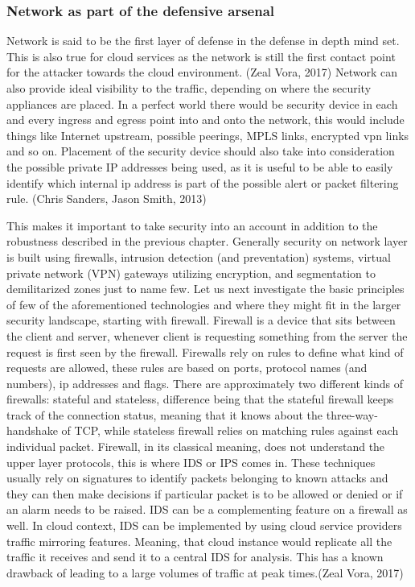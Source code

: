 \documentclass{article}
\begin{document}
\subsubsection{Network as part of the defensive arsenal}
Network is said to be the first layer of defense in the defense in depth mind set. This is also true for cloud services as the network is still the first contact point for the attacker towards the cloud environment. (Zeal Vora, 2017)
Network can also provide ideal visibility to the traffic, depending on where the security appliances are placed. In a perfect world there would be security device in each and every ingress and egress point into and onto the network, this would include things like Internet upstream, possible peerings, MPLS links, encrypted vpn links and so on. Placement of the security device should also take into consideration the possible private IP addresses being used, as it is useful to be able to easily identify which internal ip address is part of the possible alert or packet filtering rule. (Chris Sanders, Jason Smith, 2013)
\par
This makes it important to take security into an account in addition to the robustness described in the previous chapter. Generally security on network layer is built using firewalls, intrusion detection (and preventation) systems, virtual private network (VPN) gateways utilizing encryption, and segmentation to demilitarized zones just to name few. Let us next investigate the basic principles of few of the aforementioned technologies and where they might fit in the larger security landscape, starting with firewall. Firewall is a device that sits between the client and server, whenever client is requesting something from the server the request is first seen by the firewall. Firewalls rely on rules to define what kind of requests are allowed, these rules are based on ports, protocol names (and numbers), ip addresses and flags. There are approximately two different kinds of firewalls: stateful and stateless, difference being that the stateful firewall keeps track of the connection status, meaning that it knows about the three-way-handshake of TCP, while stateless firewall relies on matching rules against each individual packet. Firewall, in its classical meaning, does not understand the upper layer protocols, this is where IDS or IPS comes in. These techniques usually rely on signatures to identify packets belonging to known attacks and they can then make decisions if particular packet is to be allowed or denied or if an alarm needs to be raised. IDS can be a complementing feature on a firewall as well. In cloud context, IDS can be implemented by using cloud service providers traffic mirroring features. Meaning, that cloud instance would replicate all the traffic it receives and send it to a central IDS for analysis. This has a known drawback of leading to a large volumes of traffic at peak times.(Zeal Vora, 2017)
\end{document}
